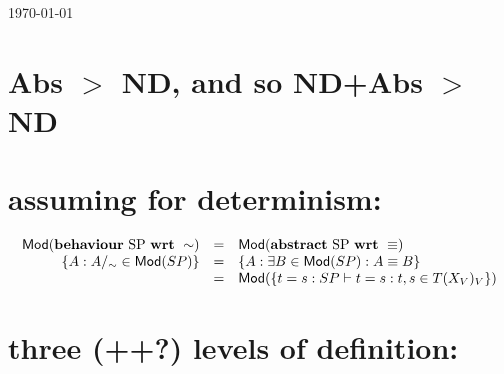 \documentclass[10pt]{article}
\newcommand{\abs}[2]{{\rm \bf abstract}\ \mbox{#1}\ {\rm \bf wrt}\ #2}
\newcommand{\beh}[2]{{\rm \bf behaviour}\ \mbox{#1}\ {\rm \bf wrt}\ #2}
\newcommand{\support}{This research was supported by the Polish
Research Committee and by the Norwegian Research Council.}
\begin{document}
 



\today 

%
%

\section{Abs $>$ ND, and so ND+Abs $>$ ND}

\section{assuming for determinism:}
\[\begin{array}{rcl}
\SMod(\beh{SP}\sim) & = & \SMod(\abs{SP}\equiv) \\
 \{A: A/_\sim\in\SMod(SP)\}  & = & \{A: \exists B\in\SMod(SP): A\equiv
B\} \\
 & = & \SMod(\{t=s:SP\vdash t=s:
t,s\in T(X_{V})_V\})
\end{array}
\]

\section{three (++?) levels of definition:}
 
\end{document}
